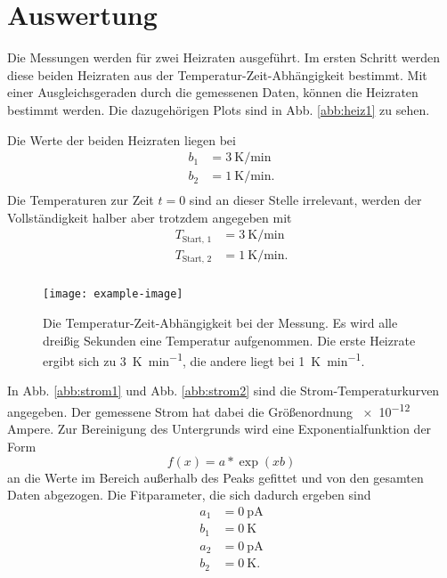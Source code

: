 \section{Auswertung}
\label{sec:Auswertung}

Die Messungen werden für zwei Heizraten ausgeführt. Im ersten Schritt werden diese beiden Heizraten aus der Temperatur-Zeit-Abhängigkeit bestimmt. Mit einer Ausgleichsgeraden durch die gemessenen Daten, können die Heizraten bestimmt werden. Die dazugehörigen Plots sind in Abb. \ref{abb:heiz1} zu sehen. 

Die Werte der beiden Heizraten liegen bei 
\begin{align*}
    b_1 &= \SI{3}{\kelvin\per\minute} \\
    b_2 &= \SI{1}{\kelvin\per\minute}. \\
\end{align*}
Die Temperaturen zur Zeit $t=0$ sind an dieser Stelle irrelevant, werden der Vollständigkeit halber aber trotzdem angegeben mit 
\begin{align*}
    T_\text{Start, 1} &= \SI{3}{\kelvin\per\minute} \\
    T_\text{Start, 2} &= \SI{1}{\kelvin\per\minute}. \\
\end{align*}

\begin{figure}
    \centering
    \texttt{[image: example-image]}
    \caption{Die Temperatur-Zeit-Abhängigkeit bei der Messung. Es wird alle dreißig Sekunden eine Temperatur aufgenommen. Die erste Heizrate ergibt sich zu \SI{3}{\kelvin\per\minute}, die andere liegt bei \SI{1}{\kelvin\per\minute}.}
    \label{abb:detector}
\end{figure}

In Abb. \ref{abb:strom1} und Abb. \ref{abb:strom2} sind die Strom-Temperaturkurven angegeben. Der gemessene Strom hat dabei die Größenordnung \num{e-12} Ampere. Zur Bereinigung des Untergrunds wird eine Exponentialfunktion der Form 
\begin{equation*}
f(x) = a * \exp\left(x b\right)
\end{equation*}  
an die Werte im Bereich außerhalb des Peaks gefittet und von den gesamten Daten abgezogen. Die Fitparameter, die sich dadurch ergeben sind 
\begin{align*}
    a_{1} &= \SI{0}{\pico\ampere} \\
    b_{1} &= \SI{0}{\kelvin} \\
    a_{2} &= \SI{0}{\pico\ampere} \\
    b_{2} &= \SI{0}{\kelvin}. \\
\end{align*}

